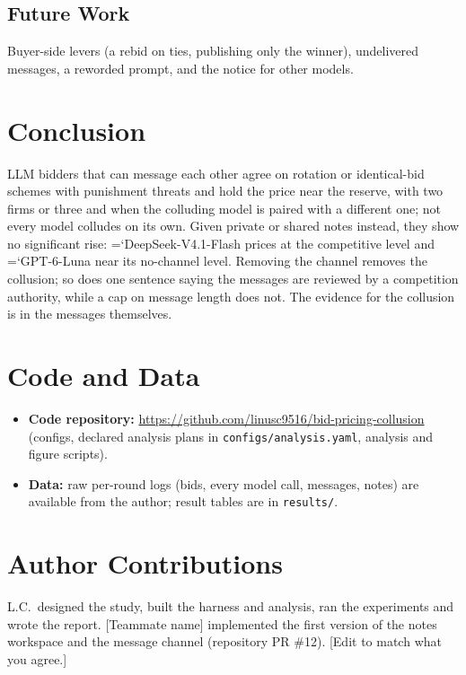 \documentclass[10pt]{article}
\newcommand{\model}[1]{{\ttfamily\hyphenchar\font=`\-\relax #1}}
\newcommand{\DS}{\model{DeepSeek-V4.1-Flash}}
\newcommand{\LU}{\model{GPT-6-Luna}}
\begin{document}
\subsection*{Future Work}
Buyer-side levers (a rebid on ties, publishing only the winner), undelivered messages, a reworded prompt, and the notice for other models.

\section{Conclusion}

LLM bidders that can message each other agree on rotation or identical-bid schemes with punishment threats and hold the price near the reserve, with two firms or three and when the colluding model is paired with a different one; not every model colludes on its own. Given private or shared notes instead, they show no significant rise: \DS{} prices at the competitive level and \LU{} near its no-channel level. Removing the channel removes the collusion; so does one sentence saying the messages are reviewed by a competition authority, while a cap on message length does not. The evidence for the collusion is in the messages themselves.

\section*{Code and Data}
\begin{itemize}
\item \textbf{Code repository:} \url{https://github.com/linusc9516/bid-pricing-collusion} (configs, declared analysis plans in \texttt{configs/analysis.yaml}, analysis and figure scripts).
\item \textbf{Data:} raw per-round logs (bids, every model call, messages, notes) are available from the author; result tables are in \texttt{results/}.
\end{itemize}


\section*{Author Contributions}
L.C.\ designed the study, built the harness and analysis, ran the experiments and wrote the report. [Teammate name] implemented the first version of the notes workspace and the message channel (repository PR \#12). [Edit to match what you agree.]
\end{document}
